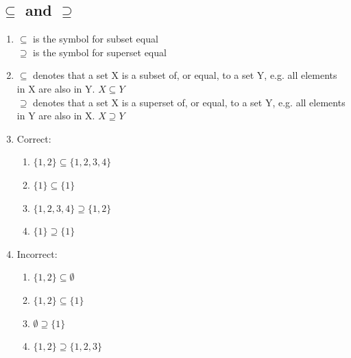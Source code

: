 \documentclass{article}
\begin{document}
\subsection{$\subseteq$ and $\supseteq$}
\begin{enumerate}
    \item $\subseteq$ is the symbol for subset equal \\
          $\supseteq$ is the symbol for superset equal
    \item $\subseteq$ denotes that a set X is a subset of, or equal, to a set Y, e.g. all elements in X are also in Y. $X \subseteq Y$ \\
          $\supseteq$ denotes that a set X is a superset of, or equal, to a set Y, e.g. all elements in Y are also in X. $X \supseteq Y$
    \item Correct:
    \begin{enumerate}
        \item $\{1, 2\} \subseteq \{1, 2, 3, 4\}$
        \item $\{1\} \subseteq \{1\}$
        \item $\{1, 2, 3, 4\} \supseteq \{1, 2\}$
        \item $\{1\} \supseteq \{1\}$
    \end{enumerate}
    \item Incorrect:
    \begin{enumerate}
        \item $\{1, 2\} \subseteq \emptyset$
        \item $\{1, 2\} \subseteq \{1\}$
        \item $\emptyset \supseteq \{1\}$
        \item $\{1, 2\} \supseteq \{1, 2, 3\}$
    \end{enumerate}
\end{enumerate}
\end{document}
